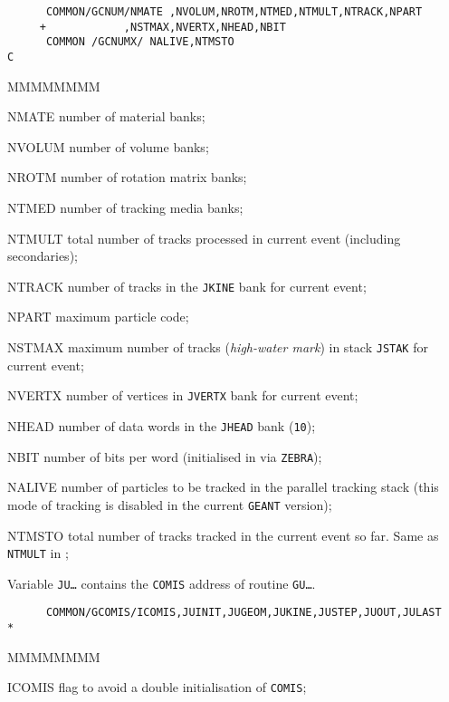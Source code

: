 \begin{verbatim}
      COMMON/GCNUM/NMATE ,NVOLUM,NROTM,NTMED,NTMULT,NTRACK,NPART
     +            ,NSTMAX,NVERTX,NHEAD,NBIT
      COMMON /GCNUMX/ NALIVE,NTMSTO
C
\end{verbatim}
\begin{DLtt}{MMMMMMMM}
\item[NMATE]   number of material banks;
\item[NVOLUM]  number of volume banks;
\item[NROTM]   number of rotation matrix banks;
\item[NTMED]   number of tracking media banks;
\item[NTMULT]  total number of tracks processed in current event
(including secondaries);
\item[NTRACK]  number of tracks in the {\tt JKINE} bank for current event;
\item[NPART]   maximum particle code;
\item[NSTMAX]  maximum number of tracks ({\it high-water mark})
in stack {\tt JSTAK} for current event;
\item[NVERTX]  number of vertices in {\tt JVERTX} bank for current event;
\item[NHEAD]   number of data words in the {\tt JHEAD} bank ({\tt 10});
\item[NBIT]    number of bits per word (initialised in 
via {\tt ZEBRA});
\item[NALIVE]number of particles to be tracked in the parallel tracking stack
(this mode of tracking is disabled in the current {\tt GEANT} version);
\item[NTMSTO]total number of tracks tracked in the current event so far. Same
as {\tt NTMULT} in ;
\end{DLtt}
Variable {\tt JU\ldots} contains the {\tt COMIS} address of routine
{\tt GU\ldots}.
\begin{verbatim}
      COMMON/GCOMIS/ICOMIS,JUINIT,JUGEOM,JUKINE,JUSTEP,JUOUT,JULAST
*
\end{verbatim}
\begin{DLtt}{MMMMMMMM}
\item[ICOMIS] flag to avoid a double initialisation of {\tt COMIS};
\end{DLtt}

